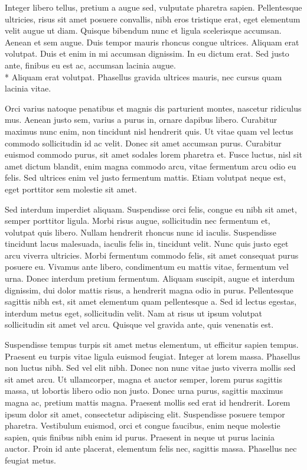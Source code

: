 \documentclass{article}
\begin{document}
Integer libero tellus, pretium a augue sed, vulputate pharetra sapien. Pellentesque ultricies, risus sit amet posuere convallis, nibh eros tristique erat, eget elementum velit augue ut diam. Quisque bibendum nunc et ligula scelerisque accumsan. Aenean et sem augue. Duis tempor mauris rhoncus congue ultrices. Aliquam erat volutpat. Duis et enim in mi accumsan dignissim. In eu dictum erat. Sed justo ante, finibus eu est ac, accumsan lacinia augue.\\*
Aliquam erat volutpat. Phasellus gravida ultrices mauris, nec cursus quam lacinia vitae.

Orci varius natoque penatibus et magnis dis parturient montes, nascetur ridiculus mus. Aenean justo sem, varius a purus in, ornare dapibus libero. Curabitur maximus nunc enim, non tincidunt nisl hendrerit quis. Ut vitae quam vel lectus commodo sollicitudin id ac velit. Donec sit amet accumsan purus. Curabitur euismod commodo purus, sit amet sodales lorem pharetra et. Fusce luctus, nisl sit amet dictum blandit, enim magna commodo arcu, vitae fermentum arcu odio eu felis. Sed ultrices enim vel justo fermentum mattis. Etiam volutpat neque est, eget porttitor sem molestie sit amet.

Sed interdum imperdiet aliquam. Suspendisse orci felis, congue eu nibh sit amet, semper porttitor ligula. Morbi risus augue, sollicitudin nec fermentum et, volutpat quis libero. Nullam hendrerit rhoncus nunc id iaculis. Suspendisse tincidunt lacus malesuada, iaculis felis in, tincidunt velit. Nunc quis justo eget arcu viverra ultricies. Morbi fermentum commodo felis, sit amet consequat purus posuere eu. Vivamus ante libero, condimentum eu mattis vitae, fermentum vel urna. Donec interdum pretium fermentum. Aliquam suscipit, augue et interdum dignissim, dui dolor mattis risus, a hendrerit magna odio in purus. Pellentesque sagittis nibh est, sit amet elementum quam pellentesque a. Sed id lectus egestas, interdum metus eget, sollicitudin velit. Nam at risus ut ipsum volutpat sollicitudin sit amet vel arcu. Quisque vel gravida ante, quis venenatis est.

Suspendisse tempus turpis sit amet metus elementum, ut efficitur sapien tempus. Praesent eu turpis vitae ligula euismod feugiat. Integer at lorem massa. Phasellus non luctus nibh. Sed vel elit nibh. Donec non nunc vitae justo viverra mollis sed sit amet arcu. Ut ullamcorper, magna et auctor semper, lorem purus sagittis massa, ut lobortis libero odio non justo. Donec urna purus, sagittis maximus magna ac, pretium mattis magna. Praesent mollis sed erat id hendrerit. Lorem ipsum dolor sit amet, consectetur adipiscing elit. Suspendisse posuere tempor pharetra. Vestibulum euismod, orci et congue faucibus, enim neque molestie sapien, quis finibus nibh enim id purus. Praesent in neque ut purus lacinia auctor. Proin id ante placerat, elementum felis nec, sagittis massa. Phasellus nec feugiat metus.
\end{document}

